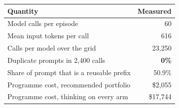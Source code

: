 \begin{tabular}{lr}
\toprule
Quantity & Measured \\
\midrule
Model calls per episode & 60 \\
Mean input tokens per call & 616 \\
Calls per model over the grid & 23,250 \\
Duplicate prompts in 2,400 calls & \textbf{0\%} \\
Share of prompt that is a reusable prefix & 50.9\% \\
\midrule
Programme cost, recommended portfolio & \$2,055 \\
Programme cost, thinking on every arm & \$17,744 \\
\bottomrule
\end{tabular}
